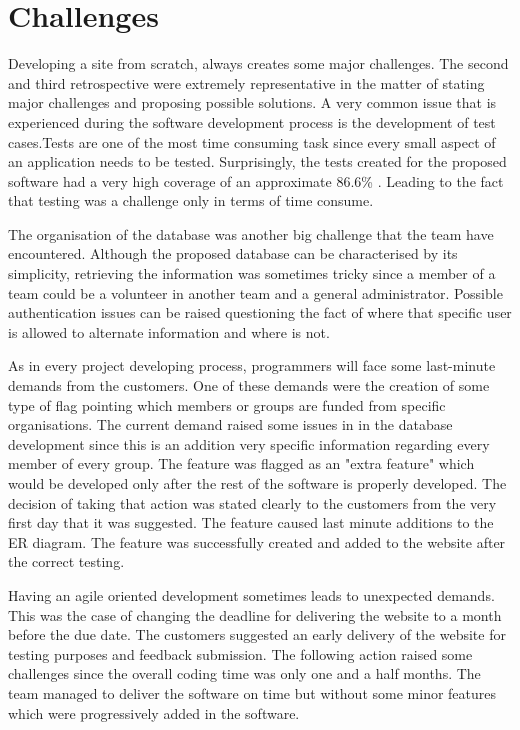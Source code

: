 \documentclass{l3proj}
\begin{document}

\section{Challenges}
\label{challenges}

Developing a site from scratch, always creates some major challenges. The second and third retrospective were extremely representative in the matter of stating major challenges and proposing possible solutions. A very common issue that is experienced during the software development process is the development of test cases.Tests are one of the most time consuming task since every small aspect of an application needs to be tested. Surprisingly, the tests created for the proposed software had a very high coverage of an approximate 86.6\% . Leading to the fact that testing was a challenge only in terms of time consume.

The organisation of the database was another big challenge that the team have encountered. Although the proposed database can be characterised by its simplicity, retrieving the information was sometimes tricky since a member of a team could be a volunteer in another team and a general administrator. Possible authentication issues can be raised questioning the fact of where that specific user is allowed to alternate information and where is not.

As in every project developing process, programmers will face some last-minute demands from the customers. One of these demands were the creation of some type of flag pointing which members or groups are funded from specific organisations. The current demand raised some issues in in the database development since this is an addition very specific information regarding every member of every group. The feature was flagged as an  "extra feature" which would be developed only after the rest of the software is properly developed. The decision of taking that action was stated clearly to the customers from the very first day that it was suggested. The feature caused last minute additions to the ER diagram. The feature was successfully created and added to the website after the correct testing.

Having an agile oriented development sometimes leads to unexpected demands. This was the case of changing the deadline for delivering the website to a month before the due date. The customers suggested an early delivery of the website for testing purposes and feedback submission. The following action raised some challenges since the overall coding time was only one and a half months. The team managed to deliver the software on time but without some minor features which were progressively added in the software.
\end{document}
